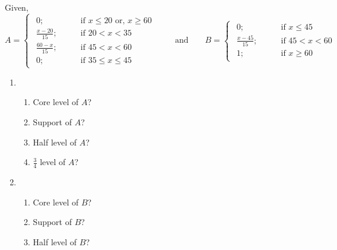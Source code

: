\documentclass[../main-sheet.tex]{subfiles}
\begin{document}
\begin{ex}
    Given,
    \[
        A=\begin{cases}
            \begin{aligned}
                0; \qquad&\text{if } x\leq20 \text{ or, }x\geq 60\\
                \frac{x-20}{15}; \qquad&\text{if }20< x<35\\
                \frac{60-x}{15}; \qquad&\text{if }45< x<60\\
                0; \qquad&\text{if }35\leq x\leq 45
            \end{aligned}
    \end{cases}
    \qquad\text{and}\qquad
    B=\begin{cases}
        \begin{aligned}
            0; \qquad&\text{if }x\leq45\\
            \frac{x-45}{15}; \qquad&\text{if }45< x<60\\
            1; \qquad&\text{if }x\geq 60
        \end{aligned}
    \end{cases}
    \]
    \begin{enumerate}
        \item \begin{enumerate}
            \item Core level of \(A \)?
            \item Support of \(A \)?
            \item Half level of \(A \)?
            \item \(\frac{3}{4}\) level of \(A \)?
        \end{enumerate}
        \item \begin{enumerate}
            \item Core level of \(B \)?
            \item Support of \(B \)?
            \item Half level of \(B \)?
        \end{enumerate}
    \end{enumerate}
\end{ex}
\end{document}
